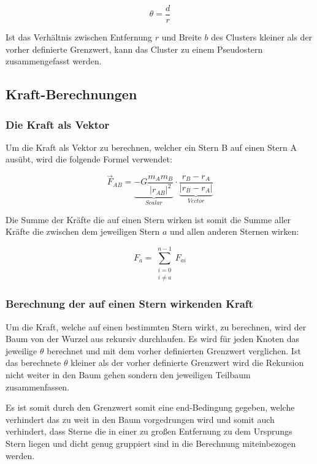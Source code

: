 \begin{equation}
\label{eq:barnes_hut} \theta = \frac{d}{r}
\end{equation}

Ist das Verhältnis zwischen Entfernung \( r \) und Breite \( b \) des Clusters
kleiner als der vorher definierte Grenzwert, kann das Cluster zu einem
Pseudostern zusammengefasst werden.

\subsection{Kraft-Berechnungen}


\subsubsection{Die Kraft als Vektor}
Um die Kraft als Vektor zu berechnen, welcher ein Stern B auf einen Stern A
ausübt, wird die folgende Formel verwendet:

\begin{equation}
    \vec{F}_{AB} = \underbrace{-G \frac{m_A m_B}{|r_{AB}|^2}}_{Scalar}
    \cdot \underbrace{\frac{r_B - r_A}{|r_B - r_A|}}_{Vector}
\end{equation}

Die Summe der Kräfte die auf einen Stern wirken ist somit die Summe aller
Kräfte die zwischen dem jeweiligen Stern \( a \) und allen anderen Sternen
wirken:

\begin{equation}
    F_{a} = \sum_{\substack{i=0 \\ i\neq a}}^{n-1} F_{ai}
\end{equation}

\subsubsection{Berechnung der auf einen Stern wirkenden Kraft}

\par Um die Kraft, welche auf einen bestimmten Stern wirkt, zu berechnen, wird der
Baum von der Wurzel aus rekursiv durchlaufen. Es wird für jeden Knoten das
jeweilige \( \theta \) berechnet und mit dem vorher definierten Grenzwert
verglichen. Ist das berechnete \( \theta \) kleiner als der vorher definierte
Grenzwert wird die Rekursion nicht weiter in den Baum gehen sondern den
jeweiligen Teilbaum zusammenfassen.

\par Es ist somit durch den Grenzwert somit eine end-Bedingung gegeben, welche
verhindert das zu weit in den Baum vorgedrungen wird und somit auch verhindert,
dass Sterne die in einer zu großen Entfernung zu dem Ursprungs Stern liegen und
dicht genug gruppiert sind in die Berechnung miteinbezogen werden.

